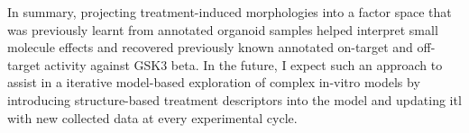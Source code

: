 \begin{flushleft}
In summary, projecting treatment-induced morphologies into a factor space that was previously learnt from annotated organoid samples helped interpret small molecule effects and recovered previously known annotated on-target and off-target activity against GSK3 beta. In the future, I expect such an approach to assist in a iterative model-based exploration of complex in-vitro models by introducing structure-based treatment descriptors into the model and updating itl with new collected data at every experimental cycle.
\bigbreak

\end{flushleft}